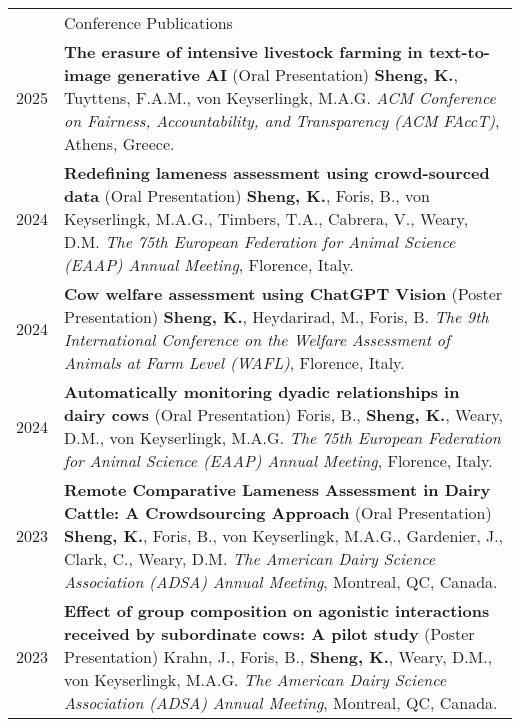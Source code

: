 \documentclass[letterpaper, 11pt]{article}
\newcommand{\headingfont}{\Large\color{OliveGreen}}
\newenvironment{SectionTable}[1]{
	\renewcommand*{\arraystretch}{1.7}
	\setlength{\tabcolsep}{10pt}
	\begin{longtable}{Rp{5.2in}} & #1 \\}
{\end{longtable}\vspace{-.3cm}}
\begin{document}
\begin{SectionTable}{\headingfont Conference Publications}
2025 & 
\textbf{The erasure of intensive livestock farming in text-to-image generative AI} (Oral Presentation) \newline
\textbf{Sheng, K.}, Tuyttens, F.A.M., von Keyserlingk, M.A.G. \newline
\textit{ACM Conference on Fairness, Accountability, and Transparency (ACM FAccT)}, Athens, Greece. \\
2024 & 
\textbf{Redefining lameness assessment using crowd-sourced data} (Oral Presentation) \newline
\textbf{Sheng, K.}, Foris, B., von Keyserlingk, M.A.G., Timbers, T.A., Cabrera, V., Weary, D.M. \newline
\textit{The 75th European Federation for Animal Science (EAAP) Annual Meeting}, Florence, Italy. \\
2024 & 
\textbf{Cow welfare assessment using ChatGPT Vision} (Poster Presentation) \newline
\textbf{Sheng, K.}, Heydarirad, M., Foris, B. \newline 
\textit{The 9th International Conference on the Welfare Assessment of Animals at Farm Level (WAFL)}, Florence, Italy. \\
2024 & 
\textbf{Automatically monitoring dyadic relationships in dairy cows} (Oral Presentation) \newline
Foris, B., \textbf{Sheng, K.}, Weary, D.M., von Keyserlingk, M.A.G. \newline
\textit{The 75th European Federation for Animal Science (EAAP) Annual Meeting}, Florence, Italy. \\
2023 & 
\textbf{Remote Comparative Lameness Assessment in Dairy Cattle: A Crowdsourcing Approach} (Oral Presentation) \newline
\textbf{Sheng, K.}, Foris, B., von Keyserlingk, M.A.G., Gardenier, J., Clark, C., Weary, D.M. \newline
\textit{The American Dairy Science Association (ADSA) Annual Meeting}, Montreal, QC, Canada. \\
2023 & 
\textbf{Effect of group composition on agonistic interactions received by subordinate cows: A pilot study} (Poster Presentation) \newline
Krahn, J., Foris, B., \textbf{Sheng, K.}, Weary, D.M., von Keyserlingk, M.A.G. \newline
\textit{The American Dairy Science Association (ADSA) Annual Meeting}, Montreal, QC, Canada. \\

\end{SectionTable}
\end{document}

